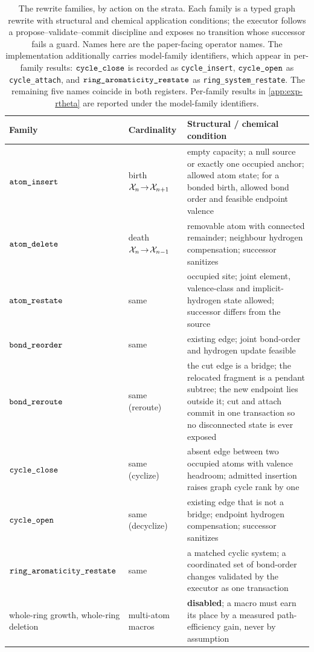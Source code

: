 \begin{table}[h]
\centering
\small
\caption{The rewrite families, by action on the strata. Each family is a typed graph rewrite with structural and chemical application conditions; the executor follows a propose--validate--commit discipline and exposes no transition whose successor fails a guard. Names here are the paper-facing operator names. The implementation additionally carries model-family identifiers, which appear in per-family results: $\op{cycle\_close}$ is recorded as \texttt{cycle\_insert}, $\op{cycle\_open}$ as \texttt{cycle\_attach}, and $\op{ring\_aromaticity\_restate}$ as \texttt{ring\_system\_restate}. The remaining five names coincide in both registers. Per-family results in \cref{app:exp-rtheta} are reported under the model-family identifiers.}
\label{tab:operators}
\begin{tabularx}{\textwidth}{@{}llY@{}}
\toprule
Family & Cardinality & Structural / chemical condition\\
\midrule
$\texttt{atom\_insert}$ & birth $\mathcal{X}_n\!\to\!\mathcal{X}_{n+1}$ & empty capacity; a null source or exactly one occupied anchor; allowed atom state; for a bonded birth, allowed bond order and feasible endpoint valence\\
$\texttt{atom\_delete}$ & death $\mathcal{X}_n\!\to\!\mathcal{X}_{n-1}$ & removable atom with connected remainder; neighbour hydrogen compensation; successor sanitizes\\
$\texttt{atom\_restate}$ & same & occupied site; joint element, valence-class and implicit-hydrogen state allowed; successor differs from the source\\
$\texttt{bond\_reorder}$ & same & existing edge; joint bond-order and hydrogen update feasible\\
$\texttt{bond\_reroute}$ & same (reroute) & the cut edge is a bridge; the relocated fragment is a pendant subtree; the new endpoint lies outside it; cut and attach commit in one transaction so no disconnected state is ever exposed\\
$\op{cycle\_close}$ & same (cyclize) & absent edge between two occupied atoms with valence headroom; admitted insertion raises graph cycle rank by one\\
$\op{cycle\_open}$ & same (decyclize) & existing edge that is not a bridge; endpoint hydrogen compensation; successor sanitizes\\
$\op{ring\_aromaticity\_restate}$ & same & a matched cyclic system; a coordinated set of bond-order changes validated by the executor as one transaction\\
\midrule
whole-ring growth, whole-ring deletion & multi-atom macros & \textbf{disabled}; a macro must earn its place by a measured path-efficiency gain, never by assumption\\
\bottomrule
\end{tabularx}
\end{table}


